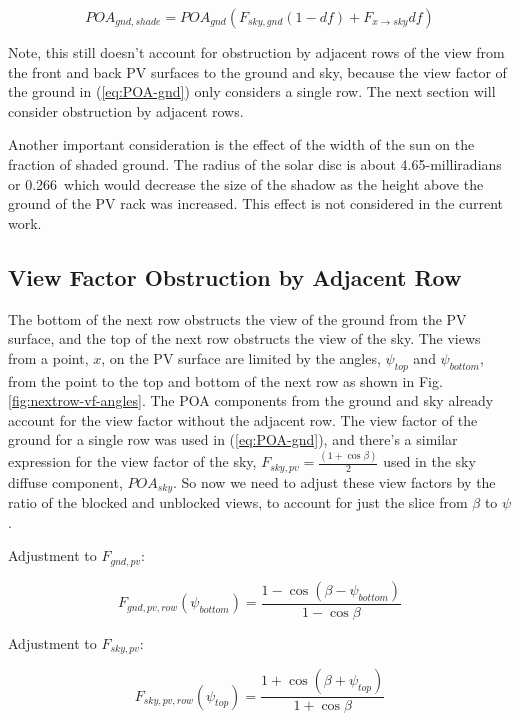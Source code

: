 \documentclass[conference]{IEEEtran}
\begin{document}
\begin{equation}
POA_{gnd,shade} = POA_{gnd}\left(F_{sky,gnd} \left(1-df \right) + F_{x \rightarrow sky} df\right)
\label{eq:POA-gnd-shade}
\end{equation}

Note, this still doesn't account for obstruction by adjacent rows of the view from the front and back PV surfaces to the ground and sky, because the view factor of the ground in (\ref{eq:POA-gnd}) only considers a single row. The next section will consider obstruction by adjacent rows.

Another important consideration is the effect of the width of the sun on the fraction of shaded ground. The radius of the solar disc is about 4.65-milliradians or 0.266\degree\ which would decrease the size of the shadow as the height above the ground of the PV rack was increased. This effect is not considered in the current work.

\subsection{View Factor Obstruction by Adjacent Row}
The bottom of the next row obstructs the view of the ground from the PV surface, and the top of the next row obstructs the view of the sky.  The views from a point, $x$, on the PV surface are limited by the angles, $\psi_{top}$ and $\psi_{bottom}$, from the point to the top and bottom of the next row as shown in Fig. \ref{fig:nextrow-vf-angles}.  The POA components from the ground and sky already account for the view factor without the adjacent row.  The view factor of the ground for a single row was used in (\ref{eq:POA-gnd}), and there's a similar expression for the view factor of the sky, $F_{sky,pv}=\frac{\left(1+\cos\beta\right)}{2}$ \cite{Marion2017} used in the sky diffuse component, $POA_{sky}$. So now we need to adjust these view factors by the ratio of the blocked and unblocked views, to account for just the slice from $\beta$ to $\psi$.

Adjustment to $F_{gnd,pv}$:

\begin{equation}
F_{gnd,pv,row}\left(\psi_{bottom} \right) = \frac{1 - \cos \left(\beta - \psi_{bottom}\right)}{1-\cos\beta}
\end{equation}

Adjustment to $F_{sky,pv}$:

\begin{equation}
F_{sky,pv,row}\left(\psi_{top} \right) = \frac{1  + \cos \left(\beta + \psi_{top}\right)}{1+\cos\beta}
\end{equation}
\end{document}
